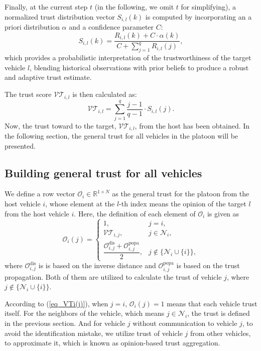 \documentclass[letterpaper, 10pt, conference]{ieeeconf}  %
\def\eqref#1{(\ref{#1})}
\def\N{\mathcal{N}} %
\def\VT{\mathcal{VT}} %
\def\O{\mathcal{O}} %
\begin{document}
Finally, at the current step $t$ (in the following, we omit $t$ for simplifying), a normalized trust distribution vector $S_{i,l}(k)$ is computed by incorporating an a priori distribution $\alpha$ and a confidence parameter $C$:
\begin{equation}
    S_{i,l}(k) = \dfrac{R_{i,l}(k) + C \cdot \alpha(k)}{C + \sum_{j=1}^{q} R_{i,l}(j)},
\end{equation}
which provides a probabilistic interpretation of the trustworthiness of the target vehicle $l$, blending historical observations with prior beliefs to produce a robust and adaptive trust estimate. 

The trust score $\VT_{i,l}$ is then calculated as:
\begin{equation}
    \VT_{i,l} = \sum_{j=1}^{q} \dfrac{j-1}{q-1} \cdot S_{i,l}(j).
\end{equation}
Now, the trust toward to the target, $\VT_{i,l}$, from the host has been obtained. In the following section, the general trust for all vehicles in the platoon will be presented.

\subsection{Building general trust for all vehicles}
We define a row vector $\O_{i} \in \mathbb{R}^{1 \times N}$ as the general trust for the platoon from the host vehicle $i$, whose element at the $l$-th index means the opinion of the target $l$ from the host vehicle $i$. Here, the definition of each element of  $\O_{i}$ is given as
\begin{equation}
    \O_{i}(j) = \begin{cases}
        1, & j = i,\\
        \VT_{i,j}, & j \in \N_{i},\\
        \dfrac{\O_{i,j}^{\text{dis}} +  \O_{i,j}^{\text{popa}} }{2}, & j \notin \{\N_{i} \cup  \{ i \}\}, 
    \end{cases} 
    \label{eq_VTi(j)}
\end{equation}
where $\O_{i,j}^{\text{dis}}$ is is based on the inverse distance and $\O_{i,j}^{\text{popa}}$ is  based on the trust propagation. Both of them are utilized to calculate the trust of vehicle $j$, where $j \notin \{\N_{i} \cup  \{ i \}\}$. 

According to \eqref{eq_VTi(j)}, when $j = i$, $\O_{i}(j)= 1$ means that each vehicle trust itself. For the neighbors of the vehicle, which means $j \in \N_{i}$, the trust is defined in the previous section. And for vehicle $j$ without communication to vehicle $j$, 
to avoid the identification mistake, we utilize trust of vehicle $j$ from other vehicles, to approximate it, which is known as opinion-based trust aggregation.  
\end{document}

